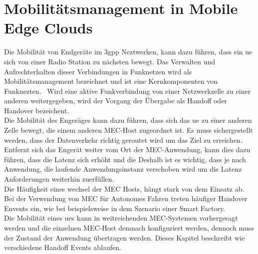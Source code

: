 \documentclass[runningheads]{llncs}
\numberwithin{figure}{section}
\begin{document}
\newpage
\section{Mobilitätsmanagement in Mobile Edge Clouds}
\label{sec:Mobilitätsmanagement}
Die Mobilität von Endgeräte im \acrshort{3gpp} Neztwerken, kann dazu führen, dass ein \acrshort{ue} sich von einer 
Radio Station zu nächsten bewegt. Das Verwalten und Aufrechterhalten dieser Verbindungen in Funknetzen wird
als Mobilitätsmanagement bezeichnet und ist eine Kernkomponenten von Funknezten. 
Wird eine aktive Funkverbindung von einer Netzwerkzelle zu einer anderen weitergegeben, wird der Vorgang
der Übergabe als Handoff oder Handover bezeichent.\\
Die Mobilität des Engeräges kann dazu führen, 
dass sich das \acrshort{ue} zu einer anderen Zelle bewegt, 
die einem anderen MEC-Host zugeordnet ist. Es muss sichergestellt werden, dass der Datenverkehr
richtig geroutet wird um das Ziel zu erreichen.
Entfernt sich das Engerät weiter vom Ort der MEC-Anwendung, 
kann dies dazu führen, dass die Latenz sich erhöht und die Deshalb ist es wichtig, dass je nach Anwendung,
die laufende Anwendungsinstanz verschoben wird um die Latenz Anforderungen weiterhin zuerfüllen. \\
Die Häufigkeit eines wechsel der MEC Hosts, hängt stark von dem 
Einsatz ab. Bei der Verwendung von MEC für Autonomes Fahren treten häufiger Handover Envents ein, wie bei
beispielsweise in dem Szenario einer Smart Factory.\\
Die Mobilität eines \acrshort{ue}s kann in weitreichenden MEC-Systemen vorhergesagt werden und die einzelnen MEC-Host demnach konfiguriert werden,
dennoch muss der Zustand der Anwendung übertragen werden.
Dieses Kapitel beschreibt wie verschiedene Handoff Events ablaufen.
\end{document}
